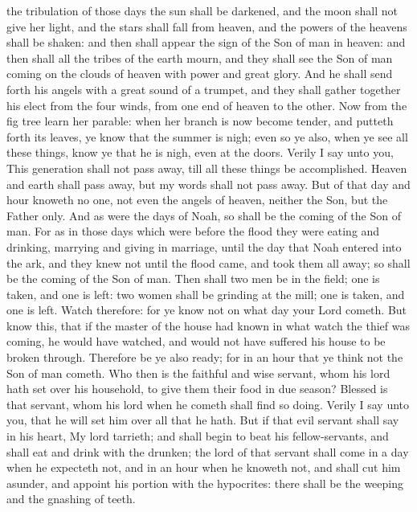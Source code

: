 the tribulation of those days the sun shall be darkened, and the moon shall not give her light, and the stars shall fall from heaven, and the powers of the heavens shall be shaken: and then shall appear the sign of the Son of man in heaven: and then shall all the tribes of the earth mourn, and they shall see the Son of man coming on the clouds of heaven with power and great glory. And he shall send forth his angels with a great sound of a trumpet, and they shall gather together his elect from the four winds, from one end of heaven to the other.  Now from the fig tree learn her parable: when her branch is now become tender, and putteth forth its leaves, ye know that the summer is nigh; even so ye also, when ye see all these things, know ye that he is nigh, even at the doors. Verily I say unto you, This generation shall not pass away, till all these things be accomplished. Heaven and earth shall pass away, but my words shall not pass away. But of that day and hour knoweth no one, not even the angels of heaven, neither the Son, but the Father only. And as were the days of Noah, so shall be the coming of the Son of man. For as in those days which were before the flood they were eating and drinking, marrying and giving in marriage, until the day that Noah entered into the ark, and they knew not until the flood came, and took them all away; so shall be the coming of the Son of man. Then shall two men be in the field; one is taken, and one is left: two women shall be grinding at the mill; one is taken, and one is left. Watch therefore: for ye know not on what day your Lord cometh. But know this, that if the master of the house had known in what watch the thief was coming, he would have watched, and would not have suffered his house to be broken through. Therefore be ye also ready; for in an hour that ye think not the Son of man cometh.  Who then is the faithful and wise servant, whom his lord hath set over his household, to give them their food in due season? Blessed is that servant, whom his lord when he cometh shall find so doing. Verily I say unto you, that he will set him over all that he hath. But if that evil servant shall say in his heart, My lord tarrieth; and shall begin to beat his fellow-servants, and shall eat and drink with the drunken; the lord of that servant shall come in a day when he expecteth not, and in an hour when he knoweth not, and shall cut him asunder, and appoint his portion with the hypocrites: there shall be the weeping and the gnashing of teeth. 

